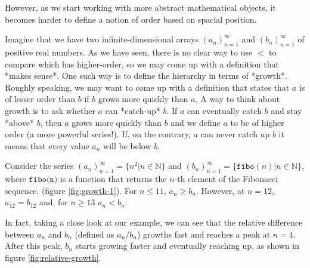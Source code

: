 \documentclass[11pt]{article}
\begin{document}
\begin{figure*}[h!]
	\centering
	
	\caption{Numbers on the real line. In this example, we see that $a < b$ since $a$ is to the left of $b$.}
	\label{fig:real-line}
\end{figure*}

However, as we start working with more abstract mathematical objects, it becomes harder to define a notion of order based on spacial position.

Imagine that we have two infinite-dimensional arrays $(a_n)_{n=1}^\infty$ and $(b_n)_{n=1}^\infty$ of positive real numbers. As we have seen, there is no clear way to use $<$ to compare which has higher-order, so we may come up with a definition that *makes sense*. One such way is to define the hierarchy in terms of *growth*. Roughly speaking, we may want to come up with a definition that states that $a$ is of lesser order than $b$ if $b$ grows more quickly than $a$. A way to think about growth is to ask whether $a$ can *catch-up* $b$. If $a$ can eventually catch $b$ and stay *above* $b$, then $a$ grows more quickly than $b$ and we define $a$ to be of higher order (a more powerful series!). If, on the contrary, $a$ can never catch up $b$ it means that every value $a_n$ will be below $b$.

Consider the series $(a_n)_{n=1}^\infty = \{n^2 \vert n\in\mathbb{N}\}$ and $(b_n)_{n=1}^\infty = \{\texttt{fibo}(n) \vert n\in\mathbb{N}\}$, where $\texttt{fibo(n)}$ is a function that returns the $n$-th element of the Fibonacci sequence. (figure \ref{fig:growth-1}). For $n \leq 11$, $a_n \geq b_n$. However, at $n=12$, $a_{12} = b_{12}$ and, for $n\geq 13$ $a_n < b_n$.

\begin{figure*}[h!]
	\centering
	\scalebox{0.5}{}
	\caption{Plot of two series}
	\label{fig:growth-1}
\end{figure*}

In fact, taking a close look at our example, we can see that the relative difference between $a_n$ and $b_n$ (defined as $a_n / b_n$) growths fast and reaches a peak at $n=4$. After this peak, $b_n$ starts growing faster and eventually reaching up, as shown in figure \ref{fig:relative-growth}.

\begin{figure*}[h!]
	\centering
	\scalebox{0.5}{}
	\caption{Plot of two series}
	\label{fig:relative-growth}
\end{figure*}
\end{document}

